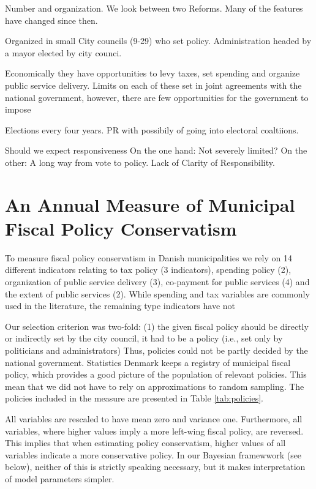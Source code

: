 \documentclass[a4paper,11pt]{article}
\begin{document}
Number and organization. We look between two Reforms. Many of the features have changed since then.

Organized in small City councils (9-29) who set policy. Administration headed by a mayor elected by city counci. 

Economically they have opportunities to levy taxes, set spending and organize public service delivery. Limits on each of these set in joint agreements with the national government, however, there are few opportunities for the government to impose 

Elections every four years. PR with possibily of going into electoral coaltiions. 

Should we expect responsiveness
On the one hand: Not severely limited?
On the other: A long way from vote to policy. Lack of Clarity of Responsibility.



\section{An Annual Measure of Municipal Fiscal Policy Conservatism}


To measure fiscal policy conservatism in Danish municipalities we rely on 14 different indicators relating to tax policy (3 indicators), spending policy (2), organization of public service delivery (3), co-payment for public services (4) and the extent of public services (2). While  spending and tax variables are commonly used in the literature, the remaining type indicators have not 

Our selection criterion was two-fold: (1) the given fiscal policy should be directly or indirectly set by the city council, it had to be a policy (i.e., set only by politicians and administrators) Thus, policies could not be partly decided by the national government. Statistics Denmark keeps a registry of municipal fiscal policy, which provides a good picture of the population of relevant policies. This mean that we did not have to rely on approximations to random sampling. The policies included in the measure are presented in Table \ref{tab:policies}.



All variables are rescaled to have mean zero and variance one. Furthermore, all variables, where higher values imply a more left-wing fiscal policy, are reversed. This implies that when estimating policy conservatism, higher values of all variables indicate a more conservative policy. In our Bayesian framewwork (see below), neither of this is strictly speaking necessary, but it makes interpretation of model parameters simpler.
\end{document}
